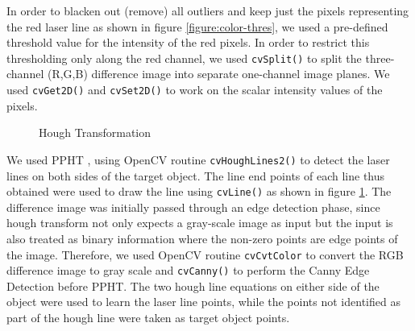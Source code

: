 In order to blacken out (remove) all outliers and keep just the pixels representing the red laser line as shown in figure \ref{figure:color-thres}, we used a pre-defined threshold value for the intensity of the red pixels. In order to restrict this thresholding only along the red channel, we used \texttt{cvSplit()} to split the three-channel (R,G,B) difference image into separate one-channel image planes. We used \texttt{cvGet2D()} and \texttt{cvSet2D()} to work on the scalar intensity values of the pixels.  

\begin{figure}[ht!]
\centering
{} \quad
{} \hfill
\caption{Hough Transformation}
\label{figure:hough-transform}
\end{figure}

We used \ac{PPHT} \cite{kiryati:1991}, \cite{matas:2000} using OpenCV routine \texttt{cvHoughLines2()} to detect the laser lines on both sides of the target object. The line end points of each line thus obtained were used to draw the line using \texttt{cvLine()} as shown in figure \ref{figure:hough-transform}. 
The difference image was initially passed through an edge detection phase, since hough transform not only expects a gray-scale image as input but the input is also treated as binary information where the non-zero points are edge points of the image. Therefore, we used OpenCV routine \texttt{cvCvtColor} to convert the RGB difference image to gray scale and \texttt{cvCanny()} to perform the Canny Edge Detection \cite{canny:1986} before \ac{PPHT}. The two hough line equations on either side of the object were used to learn the laser line points, while the points not identified as part of the hough line were taken as target object points.